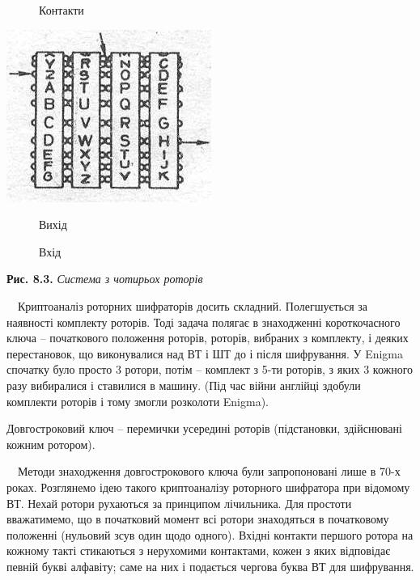 \documentclass[a4paper]{article}
\newcounter{}
\begin{document}
\begin{figure}
\centering
\begin{minipage}{1in}
Контакти
\end{minipage}
\end{figure}

\bigskip

{\centering 
\includegraphics[width=2.6354in,height=2.2189in]{crypt-img/crypt-img79.jpg}
\par}

\begin{figure}
\centering
\begin{minipage}{0.6583in}
Вихід
\end{minipage}
\end{figure}
\begin{figure}
\centering
\begin{minipage}{0.5417in}
Вхід
\end{minipage}
\end{figure}
{\centering
\textbf{Рис. 8.3. }\textit{Система з чотирьох роторів}
\par}


\bigskip

\ \ Криптоаналіз роторних шифраторів досить складний. Полегшується за наявності
комплекту роторів. Тоді задача полягає в знаходженні короткочасного ключа –
початкового положення роторів, роторів, вибраних з комплекту, і деяких
перестановок, що виконувалися над ВТ і ШТ до і після шифрування. У Enigma
спочатку було просто 3 ротори, потім – комплект з 5-ти роторів, з яких 3
кожного разу вибиралися і ставилися в машину. (Під час війни англійці здобули
комплекти роторів і тому змогли розколоти Enigma).

Довгостроковий ключ – перемички усередині роторів (підстановки, здійснювані
кожним ротором).

\ \ Методи знаходження довгострокового ключа були запропоновані лише в  70-х
роках. Розглянемо ідею такого криптоаналізу роторного шифратора при відомому
ВТ. Нехай ротори рухаються за принципом лічильника. Для простоти вважатимемо,
що в початковий момент всі ротори знаходяться в початковому положенні (нульовий
зсув один щодо одного). Вхідні контакти першого ротора на кожному такті
стикаються з нерухомими контактами, кожен з яких відповідає певній букві
алфавіту; саме на них і подається чергова буква ВТ для шифрування.
\end{document}
